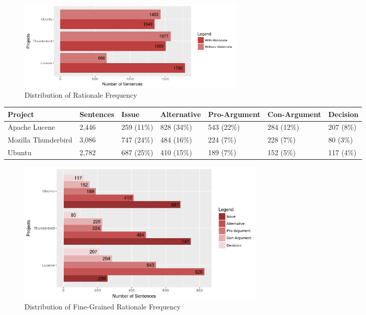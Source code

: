 \documentclass[a4paper,12pt,twoside]{report}
\begin{document}
\begin{figure}[h] %
    \centering
    \includegraphics[width=11cm]{binary-distro-rationale}
    \caption{Distribution of Rationale Frequency}
    \label{fig:distroBinaryRationale}
\end{figure}
\begin{table} %
    \centering
    \begin{adjustbox}{max width=\columnwidth}
    \def\arraystretch{1} %
    \begin{tabular}{p{4cm} p{2cm} p{2cm} p{3cm} p{2cm} p{2cm} p{2cm}}
        \toprule
        \textbf{Project} & \textbf{Sentences} & \textbf{Issue} & \textbf{Alternative} & \textbf{Pro-Argument}  & \textbf{Con-Argument}  & \textbf{Decision} \\
        \midrule
			Apache Lucene & 2,446 & 259 (11\%) & 828 (34\%)  & 543 (22\%) & 284 (12\%) & 207 (8\%)\\
			Mozilla Thunderbird & 3,086 & 747 (24\%) & 484 (16\%) & 224 (7\%) & 228 (7\%) & 80 (3\%)\\ 
			Ubuntu & 2,782 & 687 (25\%) & 410 (15\%) & 189 (7\%) & 152 (5\%) & 117 (4\%)\\
        \midrule
    \end{tabular}
    \end{adjustbox}
    \label{tab:distroMultiRationale}
\end{table}

\begin{figure}[h] %
    \centering
    \includegraphics[width=12cm]{multi-distro-rationale}
    \caption{Distribution of Fine-Grained Rationale Frequency}
    \label{fig:distroMultiRationale}
\end{figure}
\end{document}
